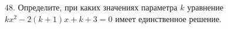 48. Определите, при каких значениях параметра $k$ уравнение $kx^2-2(k+1)x+k+3=0$ имеет единственное решение.\\

